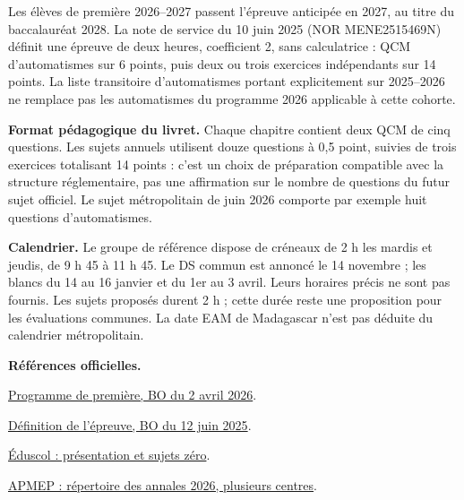 Les élèves de première 2026--2027 passent l’épreuve anticipée en 2027, au titre du baccalauréat 2028. La note de service du 10 juin 2025 (NOR MENE2515469N) définit une épreuve de deux heures, coefficient 2, sans calculatrice : QCM d’automatismes sur 6 points, puis deux ou trois exercices indépendants sur 14 points. La liste transitoire d’automatismes portant explicitement sur 2025--2026 ne remplace pas les automatismes du programme 2026 applicable à cette cohorte.

\textbf{Format pédagogique du livret.} Chaque chapitre contient deux QCM de cinq questions. Les sujets annuels utilisent douze questions à 0,5 point, suivies de trois exercices totalisant 14 points : c’est un choix de préparation compatible avec la structure réglementaire, pas une affirmation sur le nombre de questions du futur sujet officiel. Le sujet métropolitain de juin 2026 comporte par exemple huit questions d’automatismes.

\textbf{Calendrier.} Le groupe de référence dispose de créneaux de 2 h les mardis et jeudis, de 9 h 45 à 11 h 45. Le DS commun est annoncé le 14 novembre ; les blancs du 14 au 16 janvier et du 1er au 3 avril. Leurs horaires précis ne sont pas fournis. Les sujets proposés durent 2 h ; cette durée reste une proposition pour les évaluations communes. La date EAM de Madagascar n’est pas déduite du calendrier métropolitain.

\textbf{Références officielles.}\par
\href{https://www.education.gouv.fr/bo/2026/Hebdo14/MENE2602917A}{Programme de première, BO du 2 avril 2026}.\par
\href{https://www.education.gouv.fr/bo/2025/Hebdo24/MENE2515469N}{Définition de l’épreuve, BO du 12 juin 2025}.\par
\href{https://eduscol.education.gouv.fr/5688/epreuve-anticipee-de-mathematiques-aux-baccalaureats-general-et-technologique}{Éduscol : présentation et sujets zéro}.\par
\href{https://www.apmep.fr/Epreuve-anticipee-2026}{APMEP : répertoire des annales 2026, plusieurs centres}.
\tableofcontents
\clearpage
